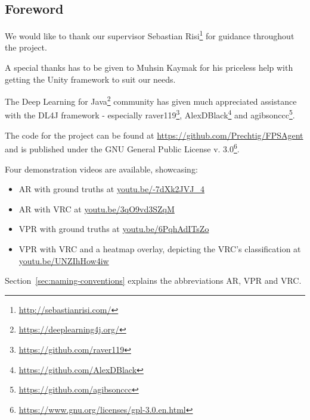 
\begin{center}
\section*{Foreword}
\vspace{1em}
\end{center}


\noindent
We would like to thank our supervisor Sebastian Risi\footnote{\url{http://sebastianrisi.com/}} for guidance throughout the project.

A special thanks has to be given to Muhsin Kaymak for his priceless help with getting the Unity framework to suit our needs.

The Deep Learning for Java\footnote{\url{https://deeplearning4j.org/}} community has given much appreciated assistance with the DL4J framework - especially raver119\footnote{\url{https://github.com/raver119}}, AlexDBlack\footnote{\url{https://github.com/AlexDBlack}} and agibsonccc\footnote{\url{https://github.com/agibsonccc}}.

\vspace{5mm}

\noindent
The code for the project can be found at \url{https://github.com/Prechtig/FPSAgent} and is published under the GNU General Public License v. 3.0\footnote{\url{https://www.gnu.org/licenses/gpl-3.0.en.html}}.

\vspace{5mm}

\noindent
Four demonstration videos are available, showcasing:
\begin{itemize}
  \item AR with ground truths at \url{youtu.be/-7dXk2JVJ_4}
  \item AR with VRC at \url{youtu.be/3qO9vd3SZqM}
  \item VPR with ground truths at \url{youtu.be/6PqhAdITsZo}
  \item VPR with VRC and a heatmap overlay, depicting the VRC's classification at \url{youtu.be/UNZIhHow4iw} 
\end{itemize}
Section~\ref{sec:naming-conventions} explains the abbreviations AR, VPR and VRC.

\restoregeometry








